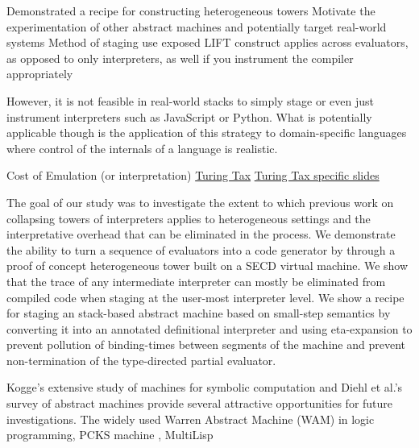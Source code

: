 \documentclass{article}
\theoremstyle{definition}
\begin{document}
Demonstrated a recipe for constructing heterogeneous towers
Motivate the experimentation of other abstract machines and potentially target real-world systems
Method of staging use exposed LIFT construct applies across evaluators, as opposed to only interpreters, as well if you instrument the compiler appropriately

However, it is not feasible in real-world stacks to simply stage or even just instrument interpreters such as JavaScript or Python. What is potentially applicable though is the application of this strategy to domain-specific languages where control of the internals of a language is realistic.

Cost of Emulation (or interpretation)
\cite{steil2004dynamic}
\href{http://materials.dagstuhl.de/files/17/17061/17061.PaulH.J.Kelly.Slides.pdf}{Turing Tax}
\href{https://www.doc.ic.ac.uk/~phjk/AdvancedCompArchitecture/Lectures/pdfs/Ch01-TuringTaxDiscussionV02.pdf}{Turing Tax specific slides}

The goal of our study was to investigate the extent to which previous work on collapsing towers of interpreters applies to heterogeneous settings and the interpretative overhead that can be eliminated in the process. We demonstrate the ability to turn a sequence of evaluators into a code generator by through a proof of concept heterogeneous tower built on a SECD virtual machine. We show that the trace of any intermediate interpreter can mostly be eliminated from compiled code when staging at the user-most interpreter level. We show a recipe for staging an stack-based abstract machine based on small-step semantics by converting it into an annotated definitional interpreter and using eta-expansion to prevent pollution of binding-times between segments of the machine and prevent non-termination of the type-directed partial evaluator.

Kogge's extensive study of machines for symbolic computation \cite{kogge1990architecture} and Diehl et al.'s survey of abstract machines provide several attractive opportunities for future investigations. The widely used Warren Abstract Machine (WAM) in logic programming, PCKS machine \cite{moreau1994pcks}, MultiLisp
\end{document}
